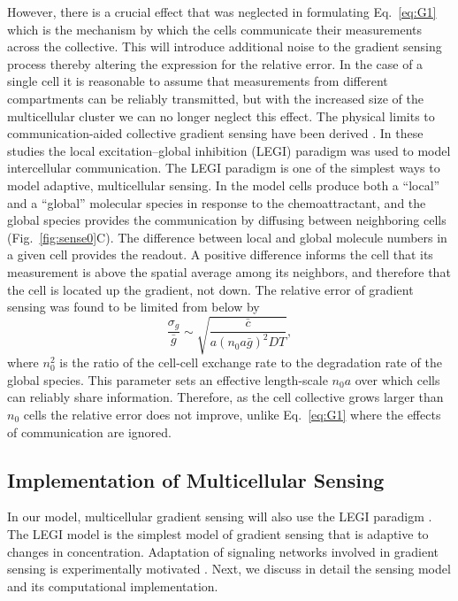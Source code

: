 \documentclass[phys,prelim]{puthesis}
\begin{document}
However, there is a crucial effect that was neglected in formulating Eq.\ \ref{eq:G1} which is the mechanism by which the cells communicate their measurements across the collective. This will introduce additional noise to the gradient sensing process thereby altering the expression for the relative error. In the case of a single cell it is reasonable to assume that measurements from different compartments can be reliably transmitted, but with the increased size of the multicellular cluster we can no longer neglect this effect. The physical limits to communication-aided collective gradient sensing have been derived \cite{ellison2015cell, mugler2015limits}. In these studies the local excitation--global inhibition (LEGI) paradigm \cite{levchenko2002models} was used to model intercellular communication. The LEGI paradigm is one of the simplest ways to model adaptive, multicellular sensing. In the model cells produce both a ``local'' and a ``global'' molecular species in response to the chemoattractant, and the global species provides the communication by diffusing between neighboring cells (Fig.\ \ref{fig:sense0}C). The difference between local and global molecule numbers in a given cell provides the readout. A positive difference informs the cell that its measurement is above the spatial average among its neighbors, and therefore that the cell is located up the gradient, not down. The relative error of gradient sensing was found to be limited from below by
\begin{equation} \label{eq:G2}
\frac{\sigma_g}{\bar{g}} \sim \sqrt{\frac{\bar{c}}{a(n_0a\bar{g})^2DT}},
\end{equation}
where $n_0^2$ is the ratio of the cell-cell exchange rate to the degradation rate of the global species. This parameter sets an effective length-scale $n_0a$ over which cells can reliably share information. Therefore, as the cell collective grows larger than $n_0$ cells the relative error does not improve, unlike Eq.\ \ref{eq:G1} where the effects of communication are ignored.

\subsection{Implementation of Multicellular Sensing}

In our model, multicellular gradient sensing will also use the LEGI paradigm \cite{mugler2015limits,levchenko2002models}. The LEGI model is the simplest model of gradient sensing that is adaptive to changes in concentration. Adaptation of signaling networks involved in gradient sensing is experimentally motivated \cite{alon1999robustness,takeda2012incoherent}. Next, we discuss in detail the sensing model and its computational implementation.
\end{document}
